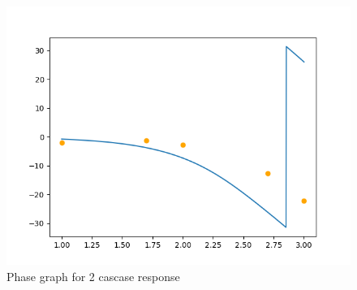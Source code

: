 \documentclass[journal]{IEEEtran}
\begin{document}
\begin{figure}[h]
    \centering
    \includegraphics[width=0.7\columnwidth]{figs/Pfig3.png}
    \caption{Phase graph for 2 cascase response}
\end{figure}
\end{document}
